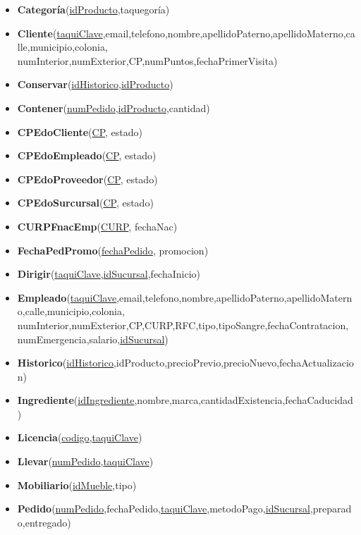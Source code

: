 \documentclass[11pt,letterpaper]{article}
\begin{document}
\begin{itemize}
\item \footnotesize{\textbf{Categoría}(\underline{idProducto},taquegoría)}
\item \footnotesize{\textbf{Cliente}(\underline{taquiClave},email,telefono,nombre,apellidoPaterno,apellidoMaterno,calle,municipio,colonia,
numInterior,numExterior,CP,numPuntos,fechaPrimerVisita)}
\item \footnotesize{\textbf{Conservar}(\underline{idHistorico},\underline{idProducto})}
\item \footnotesize{\textbf{Contener}(\underline{numPedido},\underline{idProducto},cantidad)}
\item {\footnotesize \textbf{CPEdoCliente}(\underline{CP}, estado)}
\item {\footnotesize \textbf{CPEdoEmpleado}(\underline{CP}, estado)} 
\item {\footnotesize \textbf{CPEdoProveedor}(\underline{CP}, estado) }
\item {\footnotesize \textbf{CPEdoSurcursal}(\underline{CP}, estado)}
\item{\footnotesize  \textbf{CURPFnacEmp}(\underline{CURP}, fechaNac) }
\item{\footnotesize  \textbf{FechaPedPromo}(\underline{fechaPedido}, promocion) }
\item \footnotesize{\textbf{Dirigir}(\underline{taquiClave},\underline{idSucursal},fechaInicio)}
\item \footnotesize{\textbf{Empleado}(\underline{taquiClave},email,telefono,nombre,apellidoPaterno,apellidoMaterno,calle,municipio,colonia,
numInterior,numExterior,CP,CURP,RFC,tipo,tipoSangre,fechaContratacion,
numEmergencia,salario,\underline{idSucursal})}
\item \footnotesize{\textbf{Historico}(\underline{idHistorico},idProducto,precioPrevio,precioNuevo,fechaActualizacion)}
\item \footnotesize{\textbf{Ingrediente}(\underline{idIngrediente},nombre,marca,cantidadExistencia,fechaCaducidad)}
\item \footnotesize{\textbf{Licencia}(\underline{codigo},\underline{taquiClave}})
\item \footnotesize{\textbf{Llevar}(\underline{numPedido},\underline{taquiClave})}
\item \footnotesize{\textbf{Mobiliario}(\underline{idMueble},tipo)}
\item \footnotesize{\textbf{Pedido}(\underline{numPedido},fechaPedido,\underline{taquiClave},metodoPago,\underline{idSucursal},preparado,entregado)}

\end{itemize}
\end{document}

